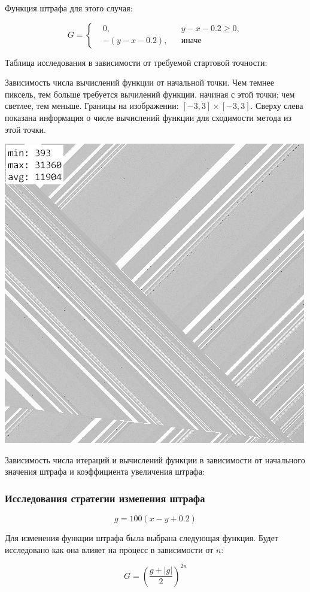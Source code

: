 Функция штрафа для этого случая:

$$ G = \left\{\begin{aligned}
&0, && y - x-0.2 \geqslant 0, \\
&-(y-x-0.2), && \text{иначе}
\end{aligned}\right. $$

Таблица исследования в зависимости от требуемой стартовой точности:


Зависимость числа вычислений функции от начальной точки. Чем темнее пиксель, тем больше требуется вычилений функции. начиная с этой точки; чем светлее, тем меньше. Границы на изображении: $[-3, 3]\times[-3, 3]$. Сверху слева показана информация о числе вычислений функции для сходимости метода из этой точки.

\noindent\begin{center}\includegraphics[width=.5\textwidth]{1.png}\end{center}

Зависимость числа итераций и вычислений функции в зависимости от начального значения штрафа и коэффициента увеличения штрафа:


\subsubsection{Исследования стратегии изменения штрафа}

$$ g = 100(x-y+0.2) $$

Для изменения функции штрафа была выбрана следующая функция. Будет исследовано как она влияет на процесс в зависимости от $n$:

$$ G = \left(\frac{g+|g|}{2}\right)^{2n} $$


